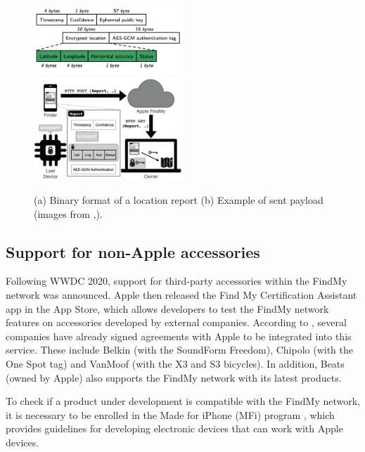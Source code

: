\documentclass[english]{article}
\begin{document}
\begin{figure}
	\centering
	\includegraphics[width=0.5\textwidth]{images/packet.png}\hfill 
	\includegraphics[width=0.5\textwidth]{images/findmysec.png}
	\caption{(a) Binary format of a location report \quad (b) Example of sent payload (images from \cite{whocanfind},\cite{airguard}).}
	\label{comparison}
\end{figure}

\subsection{Support for non-Apple accessories} 
Following WWDC 2020, support for third-party accessories within the FindMy network was announced. Apple then released the Find My Certification Assistant app in the App Store, which allows developers to test the FindMy network features on accessories developed by external companies. According to \cite{Bowe_2022}, several companies have already signed agreements with Apple to be integrated into this service. These include Belkin (with the SoundForm Freedom), Chipolo (with the One Spot tag) and VanMoof (with the X3 and S3 bicycles). In addition, Beats (owned by Apple) also supports the FindMy network with its latest products.

To check if a product under development is compatible with the FindMy network, it is necessary to be enrolled in the Made for iPhone (MFi) program \cite{MFIprogram}, which provides guidelines for developing electronic devices that can work with Apple devices.
\end{document}
